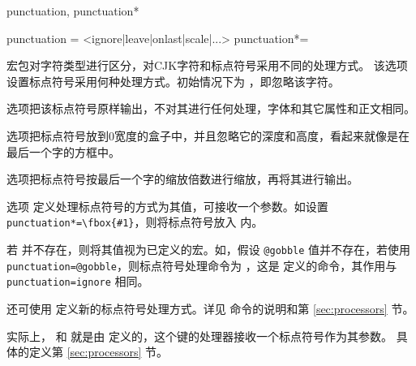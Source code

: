 \documentclass{ctxdoc}
\begin{document}
\begin{function}{punctuation, punctuation*}
  \begin{syntax}
    punctuation = <ignore|leave|onlast|scale|...> 
    punctuation*= 
  \end{syntax}
   宏包对字符类型进行区分，对CJK字符和标点符号采用不同的处理方式。
  该选项设置标点符号采用何种处理方式。初始情况下为 ，即忽略该字符。

   选项把该标点符号原样输出，不对其进行任何处理，字体和其它属性和正文相同。

   选项把标点符号放到0宽度的盒子中，并且忽略它的深度和高度，看起来就像是在最后一个字的方框中。

   选项把标点符号按最后一个字的缩放倍数进行缩放，再将其进行输出。
  
  选项  定义处理标点符号的方式为其值，可接收一个参数。如设置 \verb|punctuation*=\fbox{#1}|，则将标点符号放入  内。
  
  若  并不存在，则将其值视为已定义的宏。如，假设 \verb|@gobble| 值并不存在，若使用 \verb|punctuation=@gobble|，则标点符号处理命令为 ，这是 \LaTeXe 定义的命令，其作用与 \verb|punctuation=ignore| 相同。
  
  还可使用  定义新的标点符号处理方式。详见  命令的说明和第 \ref{sec:processors} 节。
  
  实际上， 和  就是由  定义的，这个键的处理器接收一个标点符号作为其参数。
  具体的定义第 \ref{sec:processors} 节。
\end{function}
\end{document}
